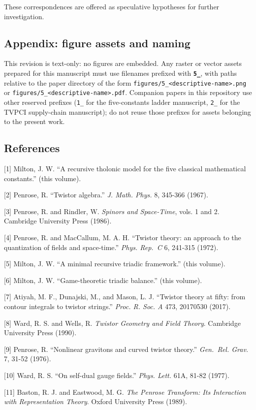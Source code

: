 \documentclass[
  11pt,
  letterpaper,
]{article}
\begin{document}
These correspondences are offered as speculative hypotheses for further
investigation.

\subsection{Appendix: figure assets and
naming}\label{appendix-figure-assets-and-naming}

This revision is text-only: no figures are embedded. Any raster or
vector assets prepared for this manuscript must use filenames prefixed
with \textbf{\texttt{5\_}}, with paths relative to the paper directory
of the form
\texttt{figures/5\_\textless{}descriptive-name\textgreater{}.png} or
\texttt{figures/5\_\textless{}descriptive-name\textgreater{}.pdf}.
Companion papers in this repository use other reserved prefixes
(\texttt{1\_} for the five-constants ladder manuscript, \texttt{2\_} for
the TVPCI supply-chain manuscript); do not reuse those prefixes for
assets belonging to the present work.

\subsection{References}\label{references}

{[}1{]} Milton, J. W. ``A recursive tholonic model for the five
classical mathematical constants.'' (this volume).

{[}2{]} Penrose, R. ``Twistor algebra.'' \emph{J. Math. Phys.} 8,
345-366 (1967).

{[}3{]} Penrose, R. and Rindler, W. \emph{Spinors and Space-Time}, vols.
1 and 2. Cambridge University Press (1986).

{[}4{]} Penrose, R. and MacCallum, M. A. H. ``Twistor theory: an
approach to the quantization of fields and space-time.'' \emph{Phys.
Rep.~C} 6, 241-315 (1972).

{[}5{]} Milton, J. W. ``A minimal recursive triadic framework.'' (this
volume).

{[}6{]} Milton, J. W. ``Game-theoretic triadic balance.'' (this volume).

{[}7{]} Atiyah, M. F., Dunajski, M., and Mason, L. J. ``Twistor theory
at fifty: from contour integrals to twistor strings.'' \emph{Proc. R.
Soc. A} 473, 20170530 (2017).

{[}8{]} Ward, R. S. and Wells, R. \emph{Twistor Geometry and Field
Theory}. Cambridge University Press (1990).

{[}9{]} Penrose, R. ``Nonlinear gravitons and curved twistor theory.''
\emph{Gen.~Rel. Grav.} 7, 31-52 (1976).

{[}10{]} Ward, R. S. ``On self-dual gauge fields.'' \emph{Phys. Lett.}
61A, 81-82 (1977).

{[}11{]} Baston, R. J. and Eastwood, M. G. \emph{The Penrose Transform:
Its Interaction with Representation Theory}. Oxford University Press
(1989).
\end{document}
